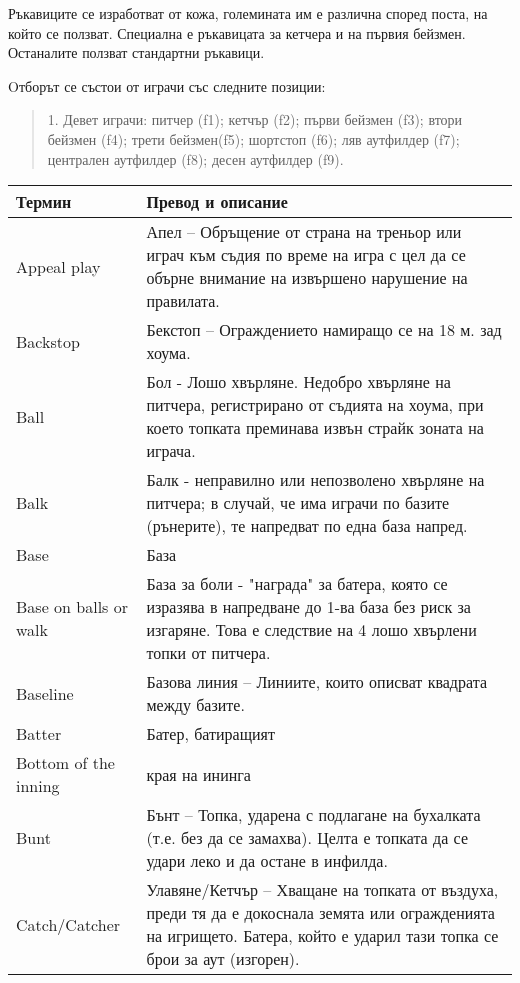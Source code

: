 Ръкавиците се изработват от кожа, големината им е различна според поста, на който се ползват. Специална е ръкавицата за кетчера и на първия бейзмен. Останалите ползват стандартни ръкавици.

Oтборът се състои от играчи със следните позиции:

\begin{quote}
    1. Девет играчи: питчер (f1); кетчър (f2); първи бейзмен (f3); втори бейзмен (f4); трети бейзмен(f5); шортстоп (f6); ляв аутфилдер (f7); централен аутфилдер (f8); десен аутфилдер (f9).
\end{quote}

    \begin{longtable}{|m{6em}|m{25em}|}
        \hline
        Термин & Превод и описание\\
        \hline
Appeal play &Апел – Обръщение от страна на треньор или играч към съдия по време на игра с цел да се обърне внимание на извършено нарушение на правилата.\\ 
Backstop &Бекстоп – Ограждението намиращо се на 18 м. зад хоума.\\ 
Ball &Бол - Лошо хвърляне. Недобро хвърляне на питчера, регистрирано от съдията на хоума, при което топката преминава извън страйк зоната на играча.\\ 
Balk &Балк - неправилно или непозволено хвърляне на питчера; в случай, че има играчи по базите (рънерите), те напредват по една база напред.\\ 
Base &База\\ 
Base on balls or walk &База за боли - "награда" за батера, която се изразява в напредване до 1-ва база без риск за изгаряне. Това е следствие на 4 лошо хвърлени топки от питчера.\\ 
Baseline &Базова линия – Линиите, които описват квадрата между базите.\\ 
Batter &Батер, батиращият\\ 
Bottom of the inning &края на ининга\\ 
Bunt &Бънт – Топка, ударена с подлагане на бухалката (т.е. без да се замахва). Целта е топката да се удари леко и да остане в инфилда.\\ 
Catch/Catcher &Улавяне/Кетчър – Хващане на топката от въздуха, преди тя да е докоснала земята или огражденията на игрището. Батера, който е ударил тази топка се брои за аут (изгорен).\\ 


\end{longtable}
